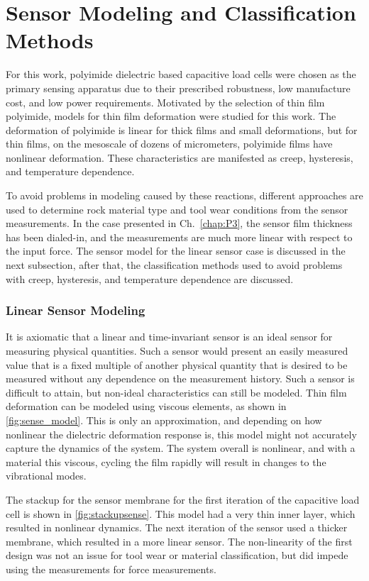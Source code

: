 \chapter{Sensor Modeling and Classification Methods
\label{chap:4}}

For this work, polyimide dielectric based capacitive load cells were chosen as the primary sensing apparatus
due to their prescribed robustness, low manufacture cost, and low power requirements.
Motivated by the selection of thin film polyimide, 
models for thin film deformation were studied for this work.
The deformation of polyimide is linear for thick films
and small deformations, but for thin films, 
on the mesoscale of dozens of micrometers,
polyimide films have nonlinear deformation.
These characteristics are manifested as creep, hysteresis, 
and temperature dependence.

To avoid problems in modeling caused by these reactions,
different approaches are used to determine rock material type and tool wear conditions 
from the sensor measurements. In the case presented in Ch.~\ref{chap:P3}, the sensor
film thickness has been dialed-in, and the measurements are much more linear with respect
to the input force. The sensor model for the linear sensor case is discussed in the next subsection,
after that, the classification methods used to avoid problems with creep, hysteresis, and temperature dependence
are discussed.

\subsection{Linear Sensor Modeling}

It is axiomatic that a linear and time-invariant sensor is an ideal sensor for measuring physical quantities.
Such a sensor would present an easily measured value that is a fixed multiple of another 
physical quantity that is desired to be measured without any dependence on the measurement history.
Such a sensor is difficult to attain, but non-ideal characteristics can still be modeled. 
Thin film deformation can be modeled using viscous elements, as shown in \ref{fig:sense_model}.
This is only an approximation, and depending on how nonlinear the dielectric deformation response is,
this model might not accurately capture the dynamics of the system.
The system overall is nonlinear, and with a material this viscous,
cycling the film rapidly will result in changes to the vibrational modes.

The stackup for the sensor membrane for the first iteration of the capacitive load cell
is shown in \ref{fig:stackupsense}. This model had a very thin inner layer, which resulted
in nonlinear dynamics. The next iteration of the sensor used a thicker membrane,
which resulted in a more linear sensor. 
The non-linearity of the first design was not an issue for tool wear or material classification,
but did impede using the measurements for force measurements. 

